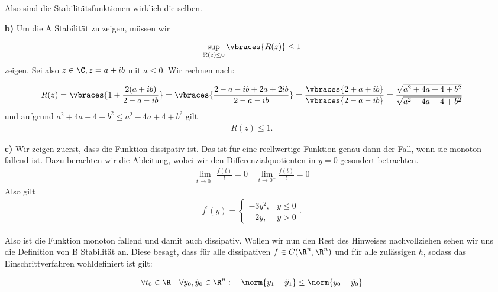\begin{solution}
\begin{itemize}
    Also sind die Stabilitätsfunktionen wirklich die selben.

  \item[\textbf{b)}] Um die A Stabilität zu zeigen, müssen wir

    \begin{align*}
      \sup\limits_{\Re(z) \leq 0} \vbraces{R(z)} \leq 1
    \end{align*}
    zeigen.
    Sei also $z \in \C, z=a+ ib$ mit $a \leq 0$. Wir rechnen nach:

    \begin{align*}
      R(z) = \vbraces{1+\frac{2(a+ib)}{2-a-ib}} = \vbraces{\frac{2-a-ib +2a +2ib}{2-a-ib}}
      = \frac{\vbraces{2+a+ib}}{\vbraces{2-a-ib}}
      = \frac{\sqrt{a^2 +4a +4 +b^2}}{\sqrt{a^2-4a+4+b^2}}
    \end{align*}
    und aufgrund $a^2 + 4a +4 +b^2 \leq a^2 -4a +4+b^2$ gilt
    \begin{align*}
      R(z) \leq 1.
    \end{align*}
  \item[\textbf{c)}] Wir zeigen zuerst, dass die Funktion dissipativ ist. Das ist für
    eine reellwertige Funktion genau dann der Fall, wenn sie monoton fallend ist. Dazu
    berachten wir die Ableitung, wobei wir den Differenzialquotienten in $y=0$  gesondert betrachten.
    \begin{align*}
    \lim\limits_{t \rightarrow 0^+} \frac{f(t)}{t} = 0 \quad
    \lim\limits_{t \rightarrow 0^-} \frac{f(t)}{t} = 0
    \end{align*}
    Also gilt
    \begin{align*}
      f^\prime (y) = \begin{cases}
      -3 y^2 , & y \leq 0 \\
      -2 y, & y > 0
    \end{cases}.
    \end{align*}

    Also ist die Funktion monoton fallend und damit auch dissipativ. Wollen wir nun
    den Rest des Hinweises nachvollziehen sehen wir uns die Definition von B Stabilität
    an. Diese besagt, dass für alle dissipativen $f \in C(\R^n ,\R^n )$ und für alle
    zulässigen $h$, sodass das Einschrittverfahren wohldefiniert ist gilt:

    \begin{align*}
      \forall t_0 \in \R \quad \forall y_0 , \tilde{y}_0 \in \R^n : \quad
      \norm{y_1 - \tilde{y}_1} \leq \norm{y_0 - \tilde{y}_0}
    \end{align*}


\end{itemize}
\end{solution}
